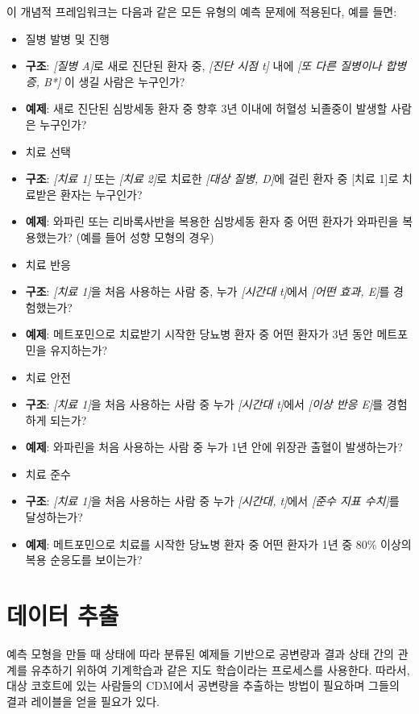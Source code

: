 \documentclass[11pt]{book}
\providecommand{\tightlist}{%
  \setlength{\itemsep}{0pt}\setlength{\parskip}{0pt}}
\theoremstyle{definition}
\theoremstyle{definition}
\theoremstyle{definition}
\theoremstyle{remark}
\begin{document}
이 개념적 프레임워크는 다음과 같은 모든 유형의 예측 문제에 적용된다,
예를 들면:

\begin{itemize}
\tightlist
\item
  질병 발병 및 진행
\item
  \textbf{구조}: \emph{{[}질병 A{]}}로 새로 진단된 환자 중,
  \emph{{[}진단 시점 t{]}} 내에 \emph{{[}또 다른 질병이나 합병증, B*{]}}
  이 생길 사람은 누구인가?
\item
  \textbf{예제}: 새로 진단된 심방세동 환자 중 향후 3년 이내에 허혈성
  뇌졸중이 발생할 사람은 누구인가?
\item
  치료 선택
\item
  \textbf{구조}: \emph{{[}치료 1{]}} 또는 \emph{{[}치료 2{]}}로 치료한
  \emph{{[}대상 질병, D{]}}에 걸린 환자 중 {[}치료 1{]}로 치료받은
  환자는 누구인가?
\item
  \textbf{예제}: 와파린 또는 리바록사반을 복용한 심방세동 환자 중 어떤
  환자가 와파린을 복용했는가? (예를 들어 성향 모형의 경우)
\item
  치료 반응
\item
  \textbf{구조}: \emph{{[}치료 1{]}}을 처음 사용하는 사람 중, 누가
  \emph{{[}시간대 t{]}}에서 \emph{{[}어떤 효과, E{]}}를 경험했는가?
\item
  \textbf{예제}: 메트포민으로 치료받기 시작한 당뇨병 환자 중 어떤 환자가
  3년 동안 메트포민을 유지하는가?
\item
  치료 안전
\item
  \textbf{구조}: \emph{{[}치료 1{]}}을 처음 사용하는 사람 중 누가
  \emph{{[}시간대 t{]}}에서 \emph{{[}이상 반응 E{]}}를 경험하게 되는가?
\item
  \textbf{예제}: 와파린을 처음 사용하는 사람 중 누가 1년 안에 위장관
  출혈이 발생하는가?
\item
  치료 준수
\item
  \textbf{구조}: \emph{{[}치료 1{]}}을 처음 사용하는 사람 중 누가
  \emph{{[}시간대, t{]}}에서 \emph{{[}준수 지표 수치{]}}를 달성하는가?
\item
  \textbf{예제}: 메트포민으로 치료를 시작한 당뇨병 환자 중 어떤 환자가
  1년 중 80\% 이상의 복용 순응도를 보이는가?
\end{itemize}

\section{데이터 추출}\label{--1}

예측 모형을 만들 때 상태에 따라 분류된 예제들 기반으로 공변량과 결과
상태 간의 관계를 유추하기 위하여 기계학습과 같은 지도 학습이라는
프로세스를 사용한다.  따라서, 대상 코호트에
있는 사람들의 CDM에서 공변량을 추출하는 방법이 필요하며 그들의 결과
레이블을 얻을 필요가 있다.
\end{document}
